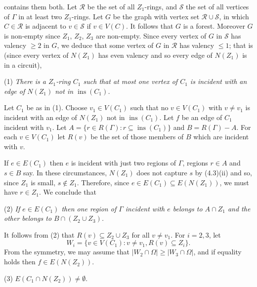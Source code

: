 \noindent contains them both. Let $\mathscr{R}$ be the set of all $Z_1$-rings, and $\mathscr{S}$ the set of all vertices of $\Gamma$ in at least two $Z_1$-rings. Let $G$ be the graph with vertex set $\mathscr{R} \cup \mathscr{S}$, in which $C \in \mathscr{R}$ is adjacent to $v \in \mathscr{S}$ if $v \in V(C)$. It follows that $G$ is a forest. Moreover $G$ is non-empty since $Z_1$, $Z_2$, $Z_3$ are non-empty. Since every vertex of $G$ in $\mathscr{S}$ has valency $\ge 2$ in $G$, we deduce that some vertex of $G$ in $\mathscr{R}$ has valency $\le 1$; that is (since every vertex of $N(Z_1)$ has even valency and so every edge of $N(Z_1)$ is in a circuit),

\hspace*{12pt}(1) \textit{There is a $Z_1$-ring $C_1$ such that at most one vertex of $C_1$ is incident with an edge of $N(Z_1)$ not in $\operatorname{ins}(C_1)$.}

Let $C_1$ be as in (1). Choose $v_1 \in V(C_1)$ such that no $v \in V(C_1)$ with $v \ne v_1$ is incident with an edge of $N(Z_1)$ not in $\operatorname{ins}(C_1)$. Let $f$ be an edge of $C_1$ incident with $v_1$. Let $A = \{r \in R(\Gamma) : r \subseteq \operatorname{ins}(C_1)\}$ and $B = R(\Gamma) - A$. For each $v \in V(C_1)$ let $R(v)$ be the set of those members of $B$ which are incident with $v$.

If $e \in E(C_1)$ then $e$ is incident with just two regions of $\Gamma$, regions $r \in A$ and $s \in B$ say. In these circumstances, $N(Z_1)$ does not capture $s$ by (4.3)(ii) and so, since $Z_1$ is small, $s \notin Z_1$. Therefore, since $e \in E(C_1) \subseteq E(N(Z_1))$, we must have $r \in Z_1$. We conclude that

\hspace*{12pt}(2) \textit{If $e \in E(C_1)$ then one region of $\Gamma$ incident with $e$ belongs to $A \cap Z_1$ and the other belongs to $B \cap (Z_2 \cup Z_3)$.}

It follows from (2) that $R(v) \subseteq Z_2 \cup Z_3$ for all $v \ne v_1$. For $i = 2, 3$, let
\begin{equation*}
W_i = \{v \in V(C_1) : v \ne v_1, R(v) \subseteq Z_i\}.
\end{equation*}
From the symmetry, we may assume that $|W_2 \cap \Omega| \ge |W_3 \cap \Omega|$, and if equality holds then $f \in E(N(Z_2))$.

\hspace*{12pt}(3) $E(C_1 \cap N(Z_2)) \ne \emptyset$.

